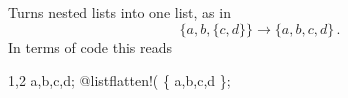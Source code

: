 
Turns nested lists into one list, as in
\begin{equation}
\{ a, b, \{ c, d \} \} \rightarrow \{ a, b, c, d \}\,.
\end{equation}
In terms of code this reads
\begin{screen}{1,2}
{a,b,{c,d}};
@listflatten!(%
\{ a,b,c,d \};
\end{screen}
~

